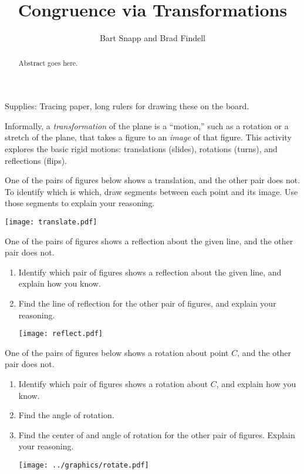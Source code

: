 \documentclass{ximera}
\title{Congruence via Transformations}
\author{Bart Snapp and Brad Findell}
\begin{document}
\begin{abstract}
Abstract goes here.  
\end{abstract}
\maketitle

\begin{teachingnote}
Supplies:  Tracing paper, long rulers for drawing these on the board.  
\end{teachingnote}

Informally, a \emph{transformation} of the plane is a ``motion,'' such as a rotation or a stretch of the plane, that takes a figure to an \emph{image} of that figure.  This activity explores the basic rigid motions: translations (slides), rotations (turns), and reflections (flips).  


\begin{problem}
One of the pairs of figures below shows a translation, and the other pair does not.  To identify which is which, draw segments between each point and its image.  Use those segments to explain your reasoning.
\begin{image}
\texttt{[image: translate.pdf]}
\end{image}
\end{problem}

\newpage
\begin{problem}
One of the pairs of figures shows a reflection about the given line, and the other pair does not.  
\begin{enumerate}
\item Identify which pair of figures shows a reflection about the given line, and explain how you know. 
\item Find the line of reflection for the other pair of figures, and explain your reasoning.  
\begin{image}
\texttt{[image: reflect.pdf]}
\end{image}
\end{enumerate}
\end{problem}

\newpage
\begin{problem}
One of the pairs of figures below shows a rotation about point $C$, and the other pair does not. 
\begin{enumerate}
\item Identify which pair of figures shows a rotation about $C$, and explain how you know.  
\item Find the angle of rotation.  
\item Find the center of and angle of rotation for the other pair of figures.  Explain your reasoning.  
\begin{image}
\texttt{[image: ../graphics/rotate.pdf]}
\end{image}
\end{enumerate}
\end{problem}
\end{document}
